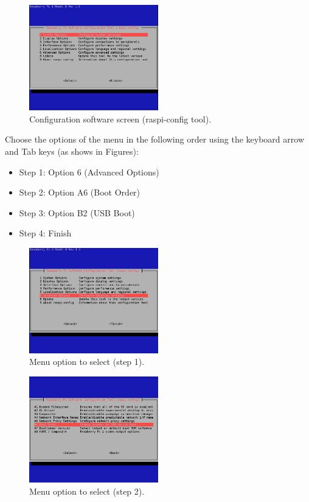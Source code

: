 \documentclass[11pt,a4paper]{article}
\begin{document}
\begin{figure}[!ht]
  \centering
  \includegraphics[width=0.5\textwidth]{pictures/screen3.jpg}
  \caption{Configuration software screen (raspi-config tool).}
  \label{fig:screen3}
\end{figure}

Choose the options of the menu in the following order using the keyboard arrow and Tab keys (as shows in Figures):
\begin{itemize}
\item Step 1: Option 6 (Advanced Options)
\item Step 2: Option A6 (Boot Order)
\item Step 3: Option B2 (USB Boot)
\item Step 4: Finish
\end{itemize}

\begin{figure}[H]
  \centering
  \includegraphics[width=0.5\textwidth]{pictures/screen4.jpg}
  \caption{Menu option to select (step 1).}
  \label{fig:screen4}
\end{figure}

\begin{figure}[H]
  \centering
  \includegraphics[width=0.5\textwidth]{pictures/screen5.jpg}
  \caption{Menu option to select (step 2).}
  \label{fig:screen5}
\end{figure}
\end{document}
